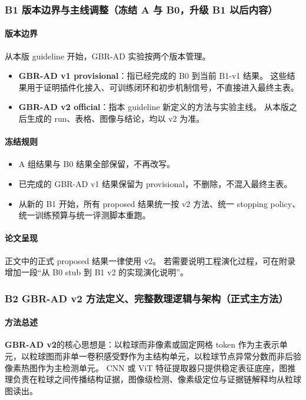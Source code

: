 \documentclass[UTF8,a4paper]{ctexart}
\newcommand{\gbrvtwo}{\textbf{GBR-AD v2}}
\begin{document}
\subsubsection{B1 版本边界与主线调整（冻结 A 与 B0，升级 B1 以后内容）}

\paragraph{版本边界}
从本版 guideline 开始，GBR-AD 实验按两个版本管理。
\begin{itemize}
  \item \textbf{GBR-AD v1 provisional}：指已经完成的 B0 到当前 B1-v1 结果。
  这些结果用于证明插件化接入、可训练闭环和初步机制信号，不直接进入最终主表。
  \item \textbf{GBR-AD v2 official}：指本 guideline 新定义的方法与实验主线。
  从本版之后生成的 run、表格、图像与结论，均以 v2 为准。
\end{itemize}

\paragraph{冻结规则}
\begin{itemize}
  \item A 组结果与 B0 结果全部保留，不再改写。
  \item 已完成的 GBR-AD v1 结果保留为 provisional，不删除，不混入最终主表。
  \item 从新的 B1 开始，所有 proposed 结果统一按 v2 方法、统一 stopping policy、统一训练预算与统一评测脚本重跑。
\end{itemize}

\paragraph{论文呈现}
正文中的正式 proposed 结果一律使用 v2。
若需要说明工程演化过程，可在附录增加一段“从 B0 stub 到 B1 v2 的实现演化说明”。

\subsubsection{B2 GBR-AD v2 方法定义、完整数理逻辑与架构（正式主方法）}

\paragraph{方法总述}
\gbrvtwo 的核心思想是：以粒球而非像素或固定网格 token 作为主表示单元，以粒球图而非单一卷积感受野作为主结构单元，以粒球节点异常分数而非后验像素热图作为主检测单元。
CNN 或 ViT 特征提取器只提供稳定表征底座，图推理负责在粒球之间传播结构证据，图像级检测、像素级定位与证据链解释均从粒球图读出。
\end{document}
